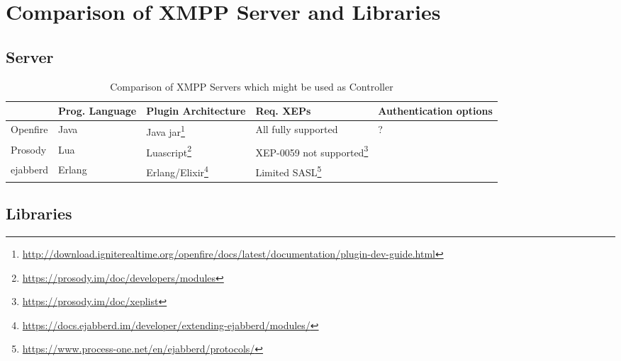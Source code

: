 \section{Comparison of XMPP Server and Libraries}\label{sec:comparison-of-xmpp-server-and-libraries}


\subsection{Server}
\begin{sidewaystable}
	\centering
	\caption{Comparison of XMPP Servers which might be used as Controller}
	\label{tbl:server-comparison}
	\begin{tabu}{X|X X X}
		\hline
		& Prog. Language
        & Plugin Architecture
        & Req. XEPs
        & Authentication options
        \\ \hline

        Openfire
        & Java
        & Java jar\footnote{\url{http://download.igniterealtime.org/openfire/docs/latest/documentation/plugin-dev-guide.html}}
        & All fully supported
        & ?
        \\

        Prosody
        & Lua
        & Luascript\footnote{\url{https://prosody.im/doc/developers/modules}}
        & XEP-0059 not supported\footnote{\url{https://prosody.im/doc/xeplist}}
        \\

        ejabberd
        & Erlang
        & Erlang/Elixir\footnote{\url{https://docs.ejabberd.im/developer/extending-ejabberd/modules/}}
        & Limited SASL\footnote{\url{https://www.process-one.net/en/ejabberd/protocols/}}
        \\

	\end{tabu}
\end{sidewaystable}


\subsection{Libraries}

